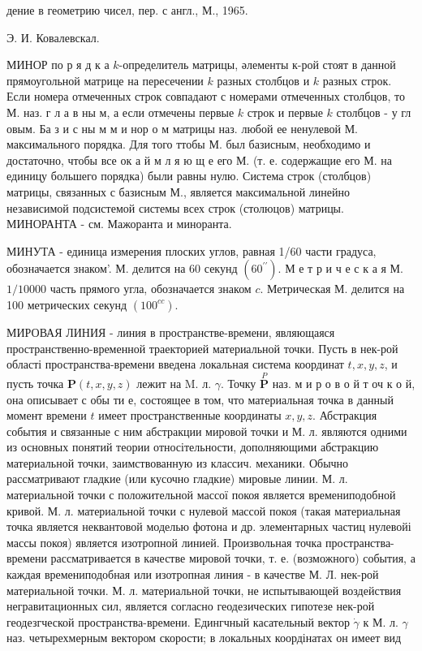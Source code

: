 \documentclass[10pt]{article}
\begin{document}
дение в геометрию чисел, пер. с англ., М., 1965.



Э. И. Ковалевскал.



МИНОР по р я д к а $k$-определитель матрицы, әлементы к-рой стоят в данной прямоугольной матрице на пересечении $k$ разных столбцов и $k$ разных строк. Если номера отмеченных строк совпадают с номерами отмеченных столбцов, то М. наз. г л а в ны м, а если отмечены первые $k$ строк и первые $k$ столбцов - у гл овым. Ба з и с ны м м и нор о м матрицы наз. любой ее ненулевой М. максимального порядка. Для того ттобы М. был базисным, необходимо и достаточно, чтобы все ок а й м л я ю щ е его М. (т. е. содержащие его М. на единицу большего порядка) были равны нулю. Система строк (столбцов) матрицы, связанных с базисным М., является максимальной линейно независимой подсистемой системы всех строк (столюцов) матрицы. МИНОРАНТА - см. Мажоранта и миноранта.



МИНУТА - единица измерения плоских углов, равная 1/60 части градуса, обозначается знаком'. М. делится на 60 секунд $\left(60^{\prime \prime}\right)$. М е т р и ч е с к а я М.$1 / 10000$ часть прямого угла, обозначается знаком $c$. Метрическая М. делится на 100 метрических секунд $\left(100^{c c}\right)$.



МИРОВАЯ ЛИНИЯ - линия в пространстве-времени, являющаяся пространственно-временной траекторией материальной точки. Пусть в нек-рой області пространства-времени введена локальная система координат $t, x, y, z$, и пусть точка $\boldsymbol{P}(t, x, y, z)$ лежит на M. л. $\gamma$. Точку $\stackrel{P}{\boldsymbol{P}}$ наз. м и р о в о й т оч к о й, она описывает с обы ти е, состоящее в том, что материальная точка в данный момент времени $t$ имеет пространственные координаты $x, y, z$. Абстракция события и связанные с ним абстракции мировой точки и М. л. являются одними из основных понятий теории относітельности, дополняющими абстракцию материальной точки, заимствованную из классич. механики. Обычно рассматривают гладкие (или кусочно гладкие) мировые линии. М. л. материальной точки с положительной массої покоя является времениподобной кривой. М. л. материальной точки с нулевой массой покоя (такая материальная точка является неквантовой моделью фотона и др. элементарных частиц нулевойі массы покоя) является изотропной линией. Произвольная точка пространства-времени рассматривается в качестве мировой точки, т. е. (возможного) события, а каждая времениподобная или изотропная линия - в качестве М. Л. нек-рой материальной точки. М. л. материальной точки, не испытывающей воздействия негравитационных сил, является согласно геодезических гипотезе нек-рой геодезгческой пространства-времени. Едингчный касательный вектор $\dot{\gamma}$ к М. л. $\gamma$ наз. четырехмерным вектором скорости; в локальных коордінатах он имеет вид
\end{document}
